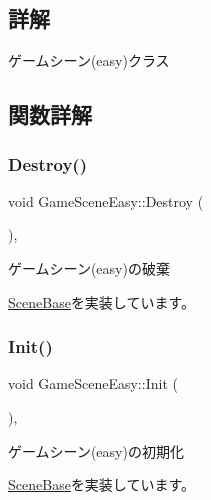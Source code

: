 \subsection{詳解}
ゲームシーン(easy)クラス 

\subsection{関数詳解}
\mbox{\label{class_game_scene_easy_aadbe3ec3a28639abca94c7868a0a97df}} 
\subsubsection{\texorpdfstring{Destroy()}{Destroy()}}
{\footnotesize\ttfamily void Game\+Scene\+Easy\+::\+Destroy (\begin{DoxyParamCaption}{ }\end{DoxyParamCaption})\hspace{0.3cm}{\ttfamily [final]}, {\ttfamily [virtual]}}



ゲームシーン(easy)の破棄 



\mbox{\hyperlink{class_scene_base_a7c5b54020bc519b4dadfe9770d6b27f7}{Scene\+Base}}を実装しています。

\mbox{\label{class_game_scene_easy_a837e9b0c8227dca2d14f975a8f007ed1}} 
\subsubsection{\texorpdfstring{Init()}{Init()}}
{\footnotesize\ttfamily void Game\+Scene\+Easy\+::\+Init (\begin{DoxyParamCaption}{ }\end{DoxyParamCaption})\hspace{0.3cm}{\ttfamily [final]}, {\ttfamily [virtual]}}



ゲームシーン(easy)の初期化 



\mbox{\hyperlink{class_scene_base_a24d7db43c819924dc8b07b436f6d3148}{Scene\+Base}}を実装しています。

